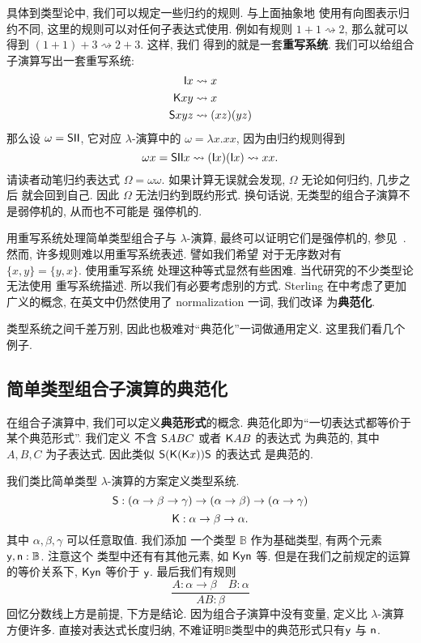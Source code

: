 具体到类型论中, 我们可以规定一些归约的规则. 与上面抽象地
使用有向图表示归约不同, 这里的规则可以对任何子表达式使用.
例如有规则 \(1 + 1 \rightsquigarrow 2\), 那么就可以
得到 \((1+1)+3 \rightsquigarrow 2 + 3\). 这样, 我们
得到的就是一套\textbf{重写系统}. 我们可以给组合子演算写出一套重写系统:
\[\begin{aligned}
\textnormal{\textsf{I}}x & \rightsquigarrow x\\
\textnormal{\textsf{K}}xy &\rightsquigarrow x\\
\textnormal{\textsf{S}}xyz &\rightsquigarrow (xz)(yz)
\end{aligned}\]
那么设 \(\omega = \textnormal{\textsf{S}}\textnormal{\textsf{I}}\textnormal{\textsf{I}}\),
它对应 \(\lambda\)-演算中的 \(\omega = \lambda x. xx\),
因为由归约规则得到
\[\omega x = \textnormal{\textsf{S}}\textnormal{\textsf{I}}\textnormal{\textsf{I}}x \rightsquigarrow (\textnormal{\textsf{I}}x)(\textnormal{\textsf{I}}x) \rightsquigarrow xx.\]
请读者动笔归约表达式 \(\Omega = \omega\omega\).
如果计算无误就会发现, \(\Omega\) 无论如何归约, 几步之后
就会回到自己. 因此 \(\Omega\) 无法归约到既约形式.
换句话说, 无类型的组合子演算不是弱停机的, 从而也不可能是
强停机的.

用重写系统处理简单类型组合子与 \(\lambda\)-演算,
最终可以证明它们是强停机的, 参见~\cite{loader:1998:stlc}.
然而, 许多规则难以用重写系统表述. 譬如我们希望
对于无序数对有 \(\{x,y\} = \{y,x\}\). 使用重写系统
处理这种等式显然有些困难. 当代研究的不少类型论无法使用
重写系统描述. 所以我们有必要考虑别的方式. Sterling
在\cite{sterling:2021:thesis}中考虑了更加广义的概念,
在英文中仍然使用了 normalization 一词, 我们改译
为\textbf{典范化}.

类型系统之间千差万别, 因此也极难对“典范化”一词做通用定义.
这里我们看几个例子.

\subsection{简单类型组合子演算的典范化}
在组合子演算中, 我们可以定义\textbf{典范形式}的概念.
典范化即为“一切表达式都等价于某个典范形式”. 我们定义
不含 \(\textnormal{\textsf{S}}ABC\) 或者 \(\textnormal{\textsf{K}}AB\) 的表达式
为典范的, 其中 \(A,B,C\) 为子表达式. 因此类似
\(\textnormal{\textsf{S}}(\textnormal{\textsf{K}}(\textnormal{\textsf{K}}x))\textnormal{\textsf{S}}\) 的表达式
是典范的.

我们类比简单类型 \(\lambda\)-演算的方案定义类型系统.
\[\textnormal{\textsf{S}} : (\alpha \to \beta \to \gamma)
\to (\alpha \to \beta) \to (\alpha \to \gamma)\]
\[\textnormal{\textsf{K}} : \alpha \to \beta \to \alpha.\]
其中 \(\alpha,\beta,\gamma\) 可以任意取值. 我们添加
一个类型 \(\mathbb B\) 作为基础类型, 有两个元素
\(\textnormal{\textsf{y}}, \textnormal{\textsf{n}} : \mathbb B\). 注意这个
类型中还有有其他元素, 如 \(\textnormal{\textsf{K}}\textnormal{\textsf{y}}\textnormal{\textsf{n}}\) 等.
但是在我们之前规定的运算的等价关系下, \(\textnormal{\textsf{K}}\textnormal{\textsf{y}}\textnormal{\textsf{n}}\) 等价于 \(\textnormal{\textsf{y}}\).
最后我们有规则
\[\frac{A : \alpha \to \beta \quad B : \alpha}{AB : \beta}\]
回忆分数线上方是前提, 下方是结论. 因为组合子演算中没有变量,
定义比 \(\lambda\)-演算方便许多. 直接对表达式长度归纳,
不难证明\(\mathbb B\)类型中的典范形式只有\(\textnormal{\textsf{y}}\)
与 \(\textnormal{\textsf{n}}\).

